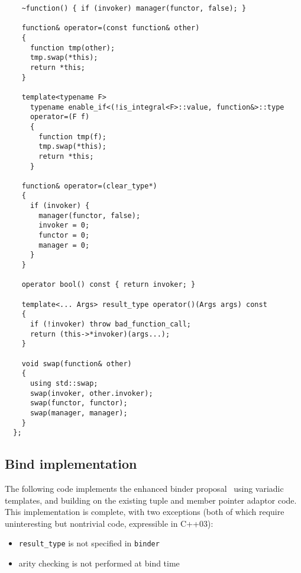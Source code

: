 \documentclass{article}
\begin{document}
\begin{verbatim}
    ~function() { if (invoker) manager(functor, false); }

    function& operator=(const function& other)
    {
      function tmp(other);
      tmp.swap(*this);
      return *this;
    }
    
    template<typename F> 
      typename enable_if<(!is_integral<F>::value, function&>::type
      operator=(F f)
      {
        function tmp(f);
        tmp.swap(*this);
        return *this;
      }
    
    function& operator=(clear_type*)
    {
      if (invoker) { 
        manager(functor, false);
        invoker = 0;
        functor = 0;
        manager = 0;
      }
    }

    operator bool() const { return invoker; }

    template<... Args> result_type operator()(Args args) const
    {
      if (!invoker) throw bad_function_call;
      return (this->*invoker)(args...);
    }
    
    void swap(function& other)
    {
      using std::swap;
      swap(invoker, other.invoker);
      swap(functor, functor);
      swap(manager, manager);
    }
  };
\end{verbatim}
\normalsize

\subsection{Bind implementation}
\label{bindimpl}
The following code implements the enhanced binder
proposal~\cite{Dimov03b} using variadic templates, and building on the
existing tuple and member pointer adaptor code. This implementation is
complete, with two exceptions (both of which require uninteresting but
nontrivial code, expressible in C++03):
\begin{itemize}
  \item {\tt result\_type} is not specified in {\tt binder}
  \item arity checking is not performed at bind time
\end{itemize}
\end{document}
